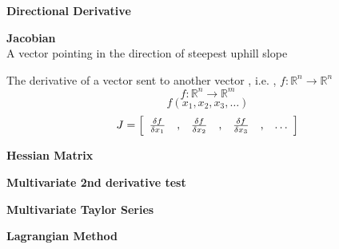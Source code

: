 \textbf{Directional Derivative}


\textbf{Jacobian}\\
A vector pointing in the direction of steepest uphill slope

The derivative of a vector sent to another vector , i.e. , \( f: \mathbb{R}^n \rightarrow \mathbb{R}^n  \)
\[
	f : \mathbb{R}^n \rightarrow \mathbb{R}^m
\]
\[
	f(x_1,x_2,x_3,\ldots)
\]
\[
	J =
	\left[ {
		\begin{array}{cc cc cc c}
			\frac{\delta f}{\delta x_1} & , &
			\frac{\delta f}{\delta x_2} & , &
			\frac{\delta f}{\delta x_3} & , &
			\ldots \\
		\end{array}
	} \right]
\]


\textbf{Hessian Matrix}

\textbf{Multivariate 2nd derivative test}

\textbf{Multivariate Taylor Series}

\textbf{Lagrangian Method}

\sectionend

